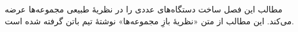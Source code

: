 \documentclass[../../../include/open-logic-section]{subfiles}
\begin{document}

\begin{editorial}
مطالب این فصل ساخت دستگاه‌های عددی را در نظریهٔ طبیعی مجموعه‌ها عرضه
می‌کند. این مطالب از متن «نظریهٔ بازِ مجموعه‌ها» نوشتهٔ تیم باتن گرفته
شده است.
\end{editorial}


\OLEndChapterHook
\end{document}
